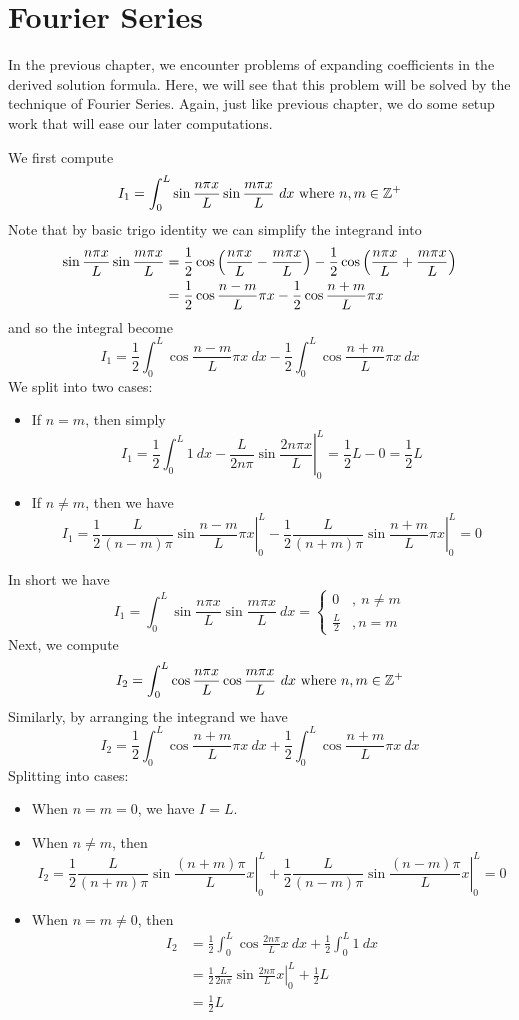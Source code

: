 \chapter{Fourier Series}

In the previous chapter, we encounter problems of expanding coefficients in the derived solution formula. Here, we will see that this problem will be solved by the technique of Fourier Series. Again, just like previous chapter, we do some setup work that will ease our later computations.

We first compute 
\[I_1 = \int_0^L \sin\frac{n\pi x}{L} \sin\frac{m\pi x}{L}\ dx \text{ where } n,m\in {\mathbb Z}^+\]
Note that by basic trigo identity we can simplify the integrand into 
\begin{align*}
    \sin\frac{n\pi x}{L} \sin\frac{m\pi x}{L} 
    &= \frac{1}{2}\cos\left(\frac{n\pi x}{L} - \frac{m\pi x}{L}\right) - \frac{1}{2}\cos\left(\frac{n\pi x}{L} + \frac{m\pi x}{L}\right)\\
    &= \frac{1}{2}\cos \frac{n-m}{L}\pi x - \frac{1}{2}\cos \frac{n+m}{L}\pi x
\end{align*}
and so the integral become 
\[I_1 = \frac{1}{2}\int_0^L \cos \frac{n-m}{L}\pi x\ dx - \frac{1}{2}\int_0^L \cos \frac{n+m}{L}\pi x\ dx\]
We split into two cases:
\begin{itemize}
    \item If $n=m$, then simply 
    \[\left . I_1 = \frac{1}{2}\int_0^L 1\ dx - \frac{L}{2n\pi} \sin\frac{2n\pi x}{L}\right \vert^L_0 = \frac{1}{2}L - 0 = \frac{1}{2}L\]
    \item If $n\neq m$, then we have 
    \[\left . I_1 = \frac{1}{2}\frac{L}{(n-m)\pi}\sin\frac{n-m}{L}\pi x\right \vert ^L_0 - \left . \frac{1}{2}\frac{L}{(n+m)\pi}\sin\frac{n+m}{L}\pi x\right \vert ^L_0 = 0\]
\end{itemize}
In short we have 
\[I_1 = \int_0^L \sin\frac{n\pi x}{L} \sin\frac{m\pi x}{L}\ dx = 
\begin{cases}
    0 &,\ n\neq m\\
    \frac{L}{2} &, n=m
\end{cases}\]
Next, we compute
\[I_2 = \int_{0}^{L} \cos\frac{n\pi x}{L}\cos\frac{m\pi x}{L}\ dx \text{ where } n,m\in {\mathbb Z}^+\]
Similarly, by arranging the integrand we have
\[I_2 = \frac{1}{2}\int_0^L \cos\frac{n+m}{L}\pi x\ dx + \frac{1}{2}\int_0^L \cos\frac{n+m}{L}\pi x\ dx\]
Splitting into cases:
\begin{itemize}
    \item When $n=m=0$, we have $I=L$.
    \item When $n\neq m$, then 
    \[I_2 = \left . \frac{1}{2}\frac{L}{(n+m)\pi}\sin\frac{(n+m)\pi}{L}x \right \vert_0^L + \left . \frac{1}{2}\frac{L}{(n-m)\pi}\sin\frac{(n-m)\pi}{L}x \right \vert_0^L = 0\]
    \item When $n=m\neq 0$, then 
    \begin{align*}
        I_2 &= \frac{1}{2}\int_0^L \cos\frac{2n\pi}{L}x\ dx + \frac{1}{2}\int_0^L 1\ dx \\
        &=\left . \frac{1}{2}\frac{L}{2n\pi}\sin\frac{2n\pi}{L}x \right \vert_0^L + \frac{1}{2}L\\
        &= \frac{1}{2}L
    \end{align*}
\end{itemize}
